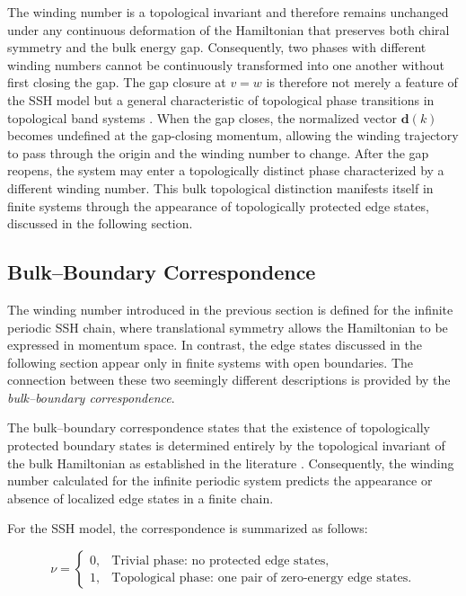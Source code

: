 \documentclass[11pt, a4paper]{article}
\begin{document}
The winding number is a topological invariant and therefore remains unchanged under any continuous deformation of the Hamiltonian that preserves both chiral symmetry and the bulk energy gap. Consequently, two phases with different winding numbers cannot be continuously transformed into one another without first closing the gap. The gap closure at \(v=w\) is therefore not merely a feature of the SSH model but a general characteristic of topological phase transitions in topological band systems \cite{hasan2010,qi2011}. When the gap closes, the normalized vector \(\mathbf d(k)\) becomes undefined at the gap-closing momentum, allowing the winding trajectory to pass through the origin and the winding number to change. After the gap reopens, the system may enter a topologically distinct phase characterized by a different winding number. This bulk topological distinction manifests itself in finite systems through the appearance of topologically protected edge states, discussed in the following section.

\subsection{Bulk--Boundary Correspondence}

The winding number introduced in the previous section is defined for the
infinite periodic SSH chain, where translational symmetry allows the
Hamiltonian to be expressed in momentum space. In contrast, the edge
states discussed in the following section appear only in finite systems
with open boundaries. The connection between these two seemingly
different descriptions is provided by the \emph{bulk--boundary
correspondence}.

The bulk--boundary correspondence states that the existence of
topologically protected boundary states is determined entirely by the
topological invariant of the bulk Hamiltonian as established in the literature \cite{asboth2015,hasan2010,qi2011}  . Consequently, the winding
number calculated for the infinite periodic system predicts the
appearance or absence of localized edge states in a finite chain.

For the SSH model, the correspondence is summarized as follows:

\[
\nu=
\begin{cases}
0, & \text{Trivial phase: no protected edge states,}\\[2mm]
1, & \text{Topological phase: one pair of zero-energy edge states.}
\end{cases}
\]
\end{document}
